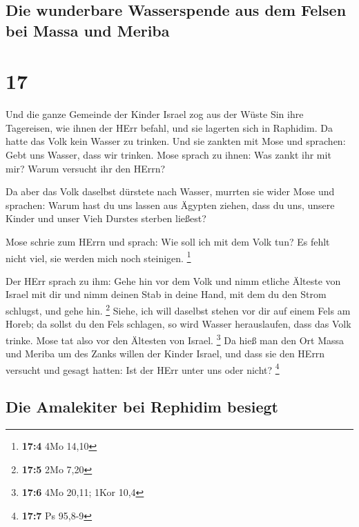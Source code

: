 \hypertarget{die-wunderbare-wasserspende-aus-dem-felsen-bei-massa-und-meriba}{%
\subsection{Die wunderbare Wasserspende aus dem Felsen bei Massa und
Meriba}\label{die-wunderbare-wasserspende-aus-dem-felsen-bei-massa-und-meriba}}

\hypertarget{section-16}{%
\section{17}\label{section-16}}

 Und die ganze Gemeinde der Kinder Israel zog aus der
Wüste Sin ihre Tagereisen, wie ihnen der HErr befahl, und sie lagerten
sich in Raphidim. Da hatte das Volk kein Wasser zu trinken.
 Und sie zankten mit Mose und sprachen: Gebt uns Wasser,
dass wir trinken. Mose sprach zu ihnen: Was zankt ihr mit mir? Warum
versucht ihr den HErrn?

 Da aber das Volk daselbst dürstete nach Wasser, murrten
sie wider Mose und sprachen: Warum hast du uns lassen aus Ägypten
ziehen, dass du uns, unsere Kinder und unser Vieh Durstes sterben
ließest?

 Mose schrie zum HErrn und sprach: Wie soll ich mit dem
Volk tun? Es fehlt nicht viel, sie werden mich noch steinigen.
\footnote{\textbf{17:4} 4Mo 14,10}

 Der HErr sprach zu ihm: Gehe hin vor dem Volk und nimm
etliche Älteste von Israel mit dir und nimm deinen Stab in deine Hand,
mit dem du den Strom schlugst, und gehe hin. \footnote{\textbf{17:5} 2Mo
  7,20}  Siehe, ich will daselbst stehen vor dir auf einem
Fels am Horeb; da sollst du den Fels schlagen, so wird Wasser
herauslaufen, dass das Volk trinke. Mose tat also vor den Ältesten von
Israel. \footnote{\textbf{17:6} 4Mo 20,11; 1Kor 10,4}  Da
hieß man den Ort Massa und Meriba um des Zanks willen der Kinder Israel,
und dass sie den HErrn versucht und gesagt hatten: Ist der HErr unter
uns oder nicht? \footnote{\textbf{17:7} Ps 95,8-9}

\hypertarget{die-amalekiter-bei-rephidim-besiegt}{%
\subsection{Die Amalekiter bei Rephidim
besiegt}\label{die-amalekiter-bei-rephidim-besiegt}}

